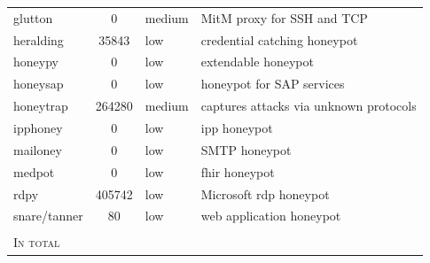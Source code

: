 \begin{table}
\begin{tabularx}{\linewidth}{l|clX}
        glutton \cite{glutton2021}               & 0                    & medium                     & MitM proxy for SSH and TCP                                                           \\
        heralding \cite{heralding2021}           & 35843                & low                        & credential catching honeypot                                                         \\
        honeypy \cite{honeysap2021}              & 0                    & low                        & extendable honeypot                                                                  \\
        honeysap \cite{honeysap2021}             & 0                    & low                        & honeypot for SAP services                                                            \\
        honeytrap \cite{honeytrap2021}           & 264280               & medium                     & captures attacks via unknown protocols                                               \\
        ipphoney \cite{ipphoney2021}             & 0                    & low                        & \ac{ipp} honeypot                                                                    \\
        mailoney                                 & 0                    & low                        & SMTP honeypot                                                                        \\
        medpot \cite{medpot2021}                 & 0                    & low                        & \ac{fhir} honeypot                                                                   \\
        rdpy \cite{rdpy2021}                     & 405742               & low                        & Microsoft \ac{rdp} honeypot                                                          \\
        snare/tanner \cite{snare2021}            & 80                   & low                        & web application honeypot                                                             \\
        \hline \\
        \textsc{In total} \\
        \bottomrule
    \end{tabularx}
    \label{tab:overview-honeypots}
\end{table}

